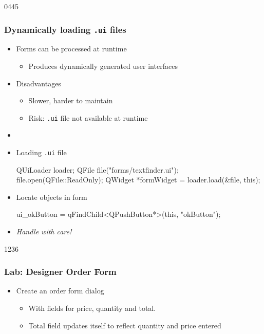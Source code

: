 \begin{slide}[fragile]{0445}
\frametitle{Dynamically loading \texttt{.ui} files}
\begin{itemize}
\item Forms can be processed at runtime
  \begin{itemize}
  \item Produces dynamically generated user interfaces
  \end{itemize}
\item Disadvantages
  \begin{itemize}
  \item Slower, harder to maintain
  \item Risk: \texttt{.ui} file not available at runtime
  \end{itemize}
\item[] 
\item Loading \texttt{.ui} file
 \begin{cpp}
QUiLoader loader;
QFile file("forms/textfinder.ui");
file.open(QFile::ReadOnly);
QWidget *formWidget = loader.load(&file, this);
\end{cpp}
\item Locate objects in form
\begin{cpp}
ui_okButton = qFindChild<QPushButton*>(this, "okButton");
\end{cpp}
\item \emph{Handle with care!}

\end{itemize}
\end{slide}


\begin{slide}[fragile]{1236}
\frametitle{Lab: Designer Order Form}
\begin{itemize}
\item Create an order form dialog
  \begin{itemize}
  \item With fields for price, quantity and total.
  \item Total field updates itself to reflect quantity and price entered
  \end{itemize}
\end{itemize} 


\end{slide}

